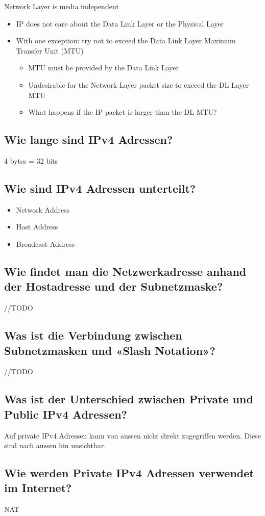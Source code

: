 Network Layer is media independent
\begin{itemize}
    \item IP does not care about the Data Link Layer or the Physical Layer
    \item With one exception: try not to exceed the Data Link Layer Maximum Transfer Unit (MTU)
    \begin{itemize}
        \item MTU must be provided by the Data Link Layer
        \item Undesirable for the Network Layer packet size to exceed the DL Layer MTU
        \item What happens if the IP packet is larger than the DL MTU?
    \end{itemize}
\end{itemize}
\subsection*{Wie lange sind IPv4 Adressen?}
4 bytes = 32 bits
\subsection*{Wie sind IPv4 Adressen unterteilt?}
\begin{itemize}
    \item Network Address
    \item Host Address
    \item Broadcast Address
\end{itemize}
\subsection*{Wie findet man die Netzwerkadresse anhand der Hostadresse und der Subnetzmaske?}
//TODO
\subsection*{Was ist die Verbindung zwischen Subnetzmasken und «Slash Notation»?}
//TODO
\subsection*{Was ist der Unterschied zwischen Private und Public IPv4 Adressen?}\label{sub:private_public_IP}
Auf private IPv4 Adressen kann von aussen nicht direkt zugegriffen werden. Diese sind nach aussen hin unsichtbar.
\subsection*{Wie werden Private IPv4 Adressen verwendet im Internet?}
NAT
